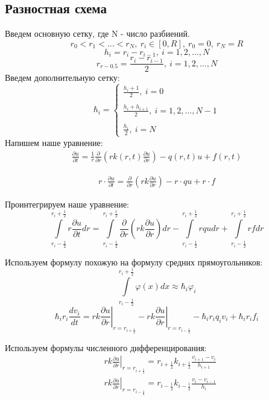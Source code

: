 \subsection{Разностная схема}
Введем основную сетку, где N - число разбиений.
\[ 
  r_0 < r_1 < \dots < r_N,\ r_i \in [0, R],\ r_0 = 0,\ r_N = R
\]
\[
  h_i =r_i - r_{i-1},\ i=1,2, \dots, N
\]
\[
  r_{r-0.5} = \frac{r_i - r_{i-1}}{2},\ i=1,2, \dots, N
\]
Введем дополнительную сетку:
\[
  \hbar_i = \begin{cases}
    \frac{h_i + 1}{2},\ i = 0 \\ \\
    \frac{h_i + h_{i+1}}{2},\ i = 1, 2, \dots, N-1 \\ \\
    \frac{h_i}{2},\ i = N
  \end{cases}
\]
Напишем наше уравнение:
\begin{align*}
  \frac{\partial u}{\partial t} = \frac{1}{r} \frac{\partial}{\partial r}
  \left ( rk(r, t)\frac{\partial u}{\partial r} \right ) - q(r, t)u + f(r,t)
\end{align*}

\begin{align*}
  r \cdot \frac{\partial u}{\partial t} = \frac{\partial}{\partial r}
  \left ( rk\frac{\partial u}{\partial r} \right ) - r \cdot qu + r \cdot f
\end{align*}

Проинтегрируем наше уравнение:
\[
  \int\limits^{r_i+\frac{1}{2}}_{r_i-\frac{1}{2}} r \frac{\partial u}{\partial t} dr =
  \int\limits^{r_i+\frac{1}{2}}_{r_i-\frac{1}{2}} \frac{\partial}{\partial r} \left ( rk\frac{\partial u}{\partial r} \right ) dr
  - \int\limits^{r_i+\frac{1}{2}}_{r_i-\frac{1}{2}} rqu dr + \int\limits^{r_i+\frac{1}{2}}_{r_i-\frac{1}{2}} rf dr
\]

Используем формулу похожую на формулу средних прямоугольников:
\[
  \int\limits^{r_i+\frac{1}{2}}_{r_i-\frac{1}{2}} \varphi(x)dx \approx \hbar_i \varphi_i
\]
\[
  \hbar_i r_i \frac{d v_i}{dt} = \left . rk \frac{\partial u}{\partial r} \right \vert_{r=r_{i+\frac{1}{2}}}
  - \left . rk \frac{\partial u}{\partial r} \right \vert_{r=r_{i-\frac{1}{2}}} -\hbar_i r_i q_i v_i + \hbar_i r_i f_i
\]

Используем формулы численного дифференцирования:
\begin{align*}
  &\left . rk \frac{\partial u}{\partial r} \right \vert_{r=r_{i+\frac{1}{2}}} = r_{i + \frac{1}{2}} k_{i + \frac{1}{2}} \frac{v_{i+1}-v_i}{h_{i + 1}} \\
  &\left . rk \frac{\partial u}{\partial r} \right \vert_{r=r_{i-\frac{1}{2}}} = r_{i - \frac{1}{2}} k_{i - \frac{1}{2}} \frac{v_{i}-v_{i-1}}{h_{i}}
\end{align*}

